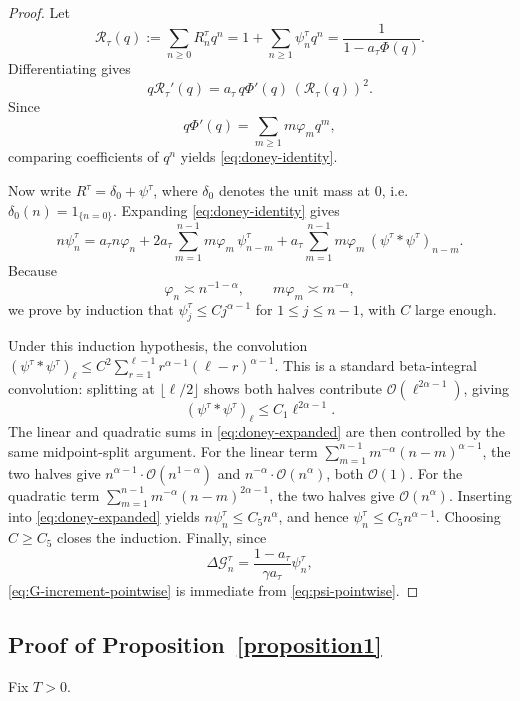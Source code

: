 \documentclass[letterpaper]{article}
\numberwithin{equation}{section}
\theoremstyle{definition}
\theoremstyle{remark}
\begin{document}
\begin{proof}
Let
\[
  \mathcal R_\tau(q):=\sum_{n\ge0}R_n^\tau q^n
  =1+\sum_{n\ge1}\psi_n^\tau q^n
  =\frac{1}{1-a_\tau\Phi(q)}.
\]
Differentiating gives
\[
  q\mathcal R_\tau'(q)
  =
  a_\tau\,q\Phi'(q)\,\left(\mathcal R_\tau(q)\right)^2.
\]
Since
\[
  q\Phi'(q)=\sum_{m\ge1}m\varphi_m q^m,
\]
comparing coefficients of $q^n$ yields \eqref{eq:doney-identity}.

Now write $R^\tau=\delta_0+\psi^\tau$, where $\delta_0$ denotes the unit mass at $0$, i.e. $\delta_0(n)=1_{\{n=0\}}$. Expanding \eqref{eq:doney-identity} gives
\begin{equation}\label{eq:doney-expanded}
  n\psi_n^\tau
  =
  a_\tau n\varphi_n
  +2a_\tau\sum_{m=1}^{n-1}m\varphi_m\,\psi_{n-m}^\tau
  +a_\tau\sum_{m=1}^{n-1}m\varphi_m\,(\psi^\tau*\psi^\tau)_{n-m}.
\end{equation}
Because
\[
  \varphi_n\asymp n^{-1-\alpha},
  \qquad
  m\varphi_m\asymp m^{-\alpha},
\]
we prove by induction that $\psi_j^\tau\le C j^{\alpha-1}$ for $1\le j\le n-1$, with $C$ large enough.

{Under this induction hypothesis, the convolution $(\psi^\tau*\psi^\tau)_\ell\le C^2\sum_{r=1}^{\ell-1}r^{\alpha-1}(\ell-r)^{\alpha-1}$. This is a standard beta-integral convolution: splitting at $\lfloor\ell/2\rfloor$ shows both halves contribute $\mathcal O(\ell^{2\alpha-1})$, giving
\[
  (\psi^\tau*\psi^\tau)_\ell \le C_1 \ell^{2\alpha-1}.
\]
The linear and quadratic sums in \eqref{eq:doney-expanded} are then controlled by the same midpoint-split argument. For the linear term $\sum_{m=1}^{n-1}m^{-\alpha}(n-m)^{\alpha-1}$, the two halves give $n^{\alpha-1}\cdot\mathcal O(n^{1-\alpha})$ and $n^{-\alpha}\cdot\mathcal O(n^\alpha)$, both $\mathcal O(1)$. For the quadratic term $\sum_{m=1}^{n-1}m^{-\alpha}(n-m)^{2\alpha-1}$, the two halves give $\mathcal O(n^\alpha)$. Inserting into \eqref{eq:doney-expanded} yields $n\psi_n^\tau\le C_5 n^\alpha$, and hence $\psi_n^\tau\le C_5 n^{\alpha-1}$. Choosing $C\ge C_5$ closes the induction.}
Finally, since
\[
  \Delta\mathcal G_n^\tau
  =
  \frac{1-a_\tau}{\gamma a_\tau}\psi_n^\tau,
\]
\eqref{eq:G-increment-pointwise} is immediate from \eqref{eq:psi-pointwise}.
\end{proof}

\subsection{Proof of Proposition~\ref{proposition1}}\label{app:proposition1}
Fix $T>0$.
\end{document}
